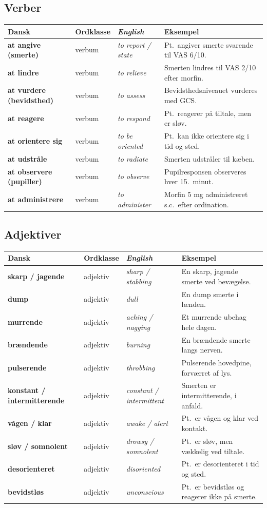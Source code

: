 \documentclass[11pt,a4paper]{report}
\makeatletter
\newcommand{\eng}[1]{\textcolor{en}{\itshape #1}}       %
\newcommand{\da}[1]{\textbf{#1}}
\newenvironment{glos}{%
  \small\renewcommand{\arraystretch}{1.35}
  \begin{longtable}{@{}>{\raggedright\arraybackslash}p{3.3cm}
                        >{\raggedright\arraybackslash}p{1.7cm}
                        >{\raggedright\arraybackslash}p{3.2cm}
                        >{\raggedright\arraybackslash}p{6.0cm}@{}}
  \toprule
  \textbf{Dansk} & \textbf{Ordklasse} & \eng{English} & \textbf{Eksempel} \\ \midrule
  \endhead
}{\bottomrule\end{longtable}}
\makeatother
\begin{document}
\subsection{Verber}
\begin{glos}
\da{at angive (smerte)} & verbum & \eng{to report / state} & Pt.\ angiver smerte svarende til VAS 6/10. \\
\da{at lindre} & verbum & \eng{to relieve} & Smerten lindres til VAS 2/10 efter morfin. \\
\da{at vurdere (bevidsthed)} & verbum & \eng{to assess} & Bevidsthedsniveauet vurderes med GCS. \\
\da{at reagere} & verbum & \eng{to respond} & Pt.\ reagerer på tiltale, men er sløv. \\
\da{at orientere sig} & verbum & \eng{to be oriented} & Pt.\ kan ikke orientere sig i tid og sted. \\
\da{at udstråle} & verbum & \eng{to radiate} & Smerten udstråler til kæben. \\
\da{at observere (pupiller)} & verbum & \eng{to observe} & Pupilresponsen observeres hver 15.\ minut. \\
\da{at administrere} & verbum & \eng{to administer} & Morfin 5 mg administreret s.c.\ efter ordination. \\
\end{glos}

\subsection{Adjektiver}
\begin{glos}
\da{skarp / jagende} & adjektiv & \eng{sharp / stabbing} & En skarp, jagende smerte ved bevægelse. \\
\da{dump} & adjektiv & \eng{dull} & En dump smerte i lænden. \\
\da{murrende} & adjektiv & \eng{aching / nagging} & Et murrende ubehag hele dagen. \\
\da{brændende} & adjektiv & \eng{burning} & En brændende smerte langs nerven. \\
\da{pulserende} & adjektiv & \eng{throbbing} & Pulserende hovedpine, forværret af lys. \\
\da{konstant / intermitterende} & adjektiv & \eng{constant / intermittent} & Smerten er intermitterende, i anfald. \\
\da{vågen / klar} & adjektiv & \eng{awake / alert} & Pt.\ er vågen og klar ved kontakt. \\
\da{sløv / somnolent} & adjektiv & \eng{drowsy / somnolent} & Pt.\ er sløv, men vækkelig ved tiltale. \\
\da{desorienteret} & adjektiv & \eng{disoriented} & Pt.\ er desorienteret i tid og sted. \\
\da{bevidstløs} & adjektiv & \eng{unconscious} & Pt.\ er bevidstløs og reagerer ikke på smerte. \\
\end{glos}
\end{document}
